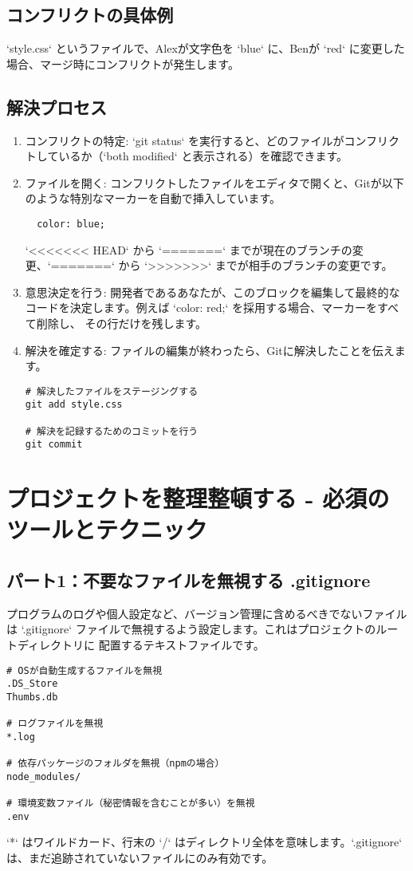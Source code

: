 \documentclass{ltjsarticle}
\begin{document}
\subsection{コンフリクトの具体例}
`style.css` というファイルで、Alexが文字色を `blue` に、Benが `red` に変更した場合、マージ時にコンフリクトが発生します。

\subsection{解決プロセス}
\begin{enumerate}
    \item コンフリクトの特定: `git status` を実行すると、どのファイルがコンフリクトしているか（`both modified` と表示される）を確認できます。
    \item ファイルを開く: コンフリクトしたファイルをエディタで開くと、Gitが以下のような特別なマーカーを自動で挿入しています。
    \begin{verbatim}
  color: blue;
\end{verbatim}
    `<<<<<<< HEAD` から `=======` までが現在のブランチの変更、`=======` から `>>>>>>>` までが相手のブランチの変更です。
    \item 意思決定を行う: 開発者であるあなたが、このブロックを編集して最終的なコードを決定します。例えば `color: red;` を採用する場合、マーカーをすべて削除し、
    その行だけを残します。
    \item 解決を確定する: ファイルの編集が終わったら、Gitに解決したことを伝えます。
    \begin{verbatim}
# 解決したファイルをステージングする
git add style.css

# 解決を記録するためのコミットを行う
git commit
\end{verbatim}
\end{enumerate}

\section{プロジェクトを整理整頓する - 必須のツールとテクニック}
\subsection{パート1：不要なファイルを無視する .gitignore}
プログラムのログや個人設定など、バージョン管理に含めるべきでないファイルは `.gitignore` ファイルで無視するよう設定します。これはプロジェクトのルートディレクトリに
配置するテキストファイルです。
\begin{verbatim}
# OSが自動生成するファイルを無視
.DS_Store
Thumbs.db

# ログファイルを無視
*.log

# 依存パッケージのフォルダを無視（npmの場合）
node_modules/

# 環境変数ファイル（秘密情報を含むことが多い）を無視
.env
\end{verbatim}
`*` はワイルドカード、行末の `/` はディレクトリ全体を意味します。`.gitignore` は、まだ追跡されていないファイルにのみ有効です。
\end{document}
